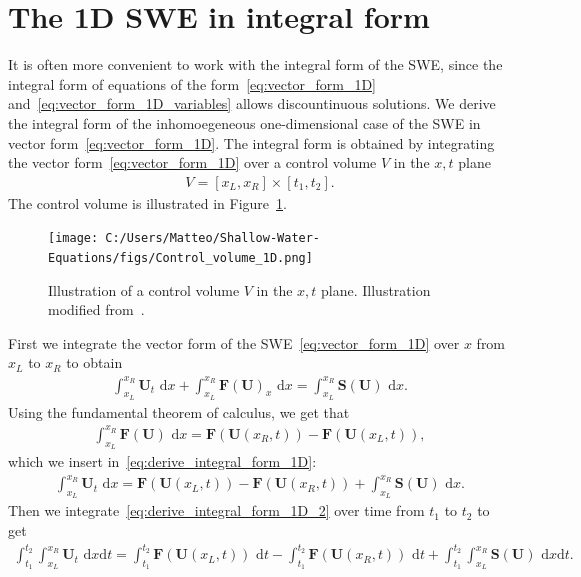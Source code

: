 \section{The 1D SWE in integral form}
It is often more convenient to work with the integral form of the SWE, since the integral form of equations of the form~\eqref{eq:vector_form_1D} and~\eqref{eq:vector_form_1D_variables} allows discountinuous solutions.
We derive the integral form of the inhomoegeneous one-dimensional case of the SWE in vector form~\eqref{eq:vector_form_1D}.
The integral form is obtained by integrating the vector form~\eqref{eq:vector_form_1D} over a control volume $V$ in the $x,t$ plane
\begin{align*}
    V = [x_L, x_R] \times [t_1, t_2].
\end{align*}
The control volume is illustrated in Figure~\ref{fig:control_volume_1D}.
\begin{figure}[H]
    \centering
    \texttt{[image: C:/Users/Matteo/Shallow-Water-Equations/figs/Control\_volume\_1D.png]}
    \caption{Illustration of a control volume $V$ in the $x,t$ plane. Illustration modified from~\cite{Toro2024}.}\label{fig:control_volume_1D}
\end{figure}
First we integrate the vector form of the SWE~\eqref{eq:vector_form_1D} over $x$ from $x_L$ to $x_R$ to obtain
\begin{align}\label{eq:derive_integral_form_1D}
    \int_{x_L}^{x_R} \mathbf{U}_t \text{ d}x + \int_{x_L}^{x_R} \mathbf{F(U)}_x \text{ d}x = \int_{x_L}^{x_R} \mathbf{S(U)} \text{ d}x.
\end{align}
Using the fundamental theorem of calculus, we get that 
\begin{align*}
    \int_{x_L}^{x_R} \mathbf{F}(\mathbf{U}) \text{ d}x = \mathbf{F}(\mathbf{U}(x_R, t)) - \mathbf{F}(\mathbf{U}(x_L, t)),
\end{align*}
which we insert in~\eqref{eq:derive_integral_form_1D}:
\begin{align}\label{eq:derive_integral_form_1D_2}
    \int_{x_L}^{x_R} \mathbf{U}_t \text{ d}x = \mathbf{F}(\mathbf{U}(x_L, t)) - \mathbf{F}(\mathbf{U}(x_R, t)) + \int_{x_L}^{x_R} \mathbf{S(U)} \text{ d}x.
\end{align}
Then we integrate~\eqref{eq:derive_integral_form_1D_2} over time from $t_1$ to $t_2$ to get
\begin{align*}
    \int_{t_1}^{t_2} \int_{x_L}^{x_R} \mathbf{U}_t \text{ d}x \text{d}t = \int_{t_1}^{t_2} \mathbf{F}(\mathbf{U}(x_L, t)) \text{ d}t - \int_{t_1}^{t_2} \mathbf{F}(\mathbf{U}(x_R, t)) \text{ d}t + \int_{t_1}^{t_2} \int_{x_L}^{x_R} \mathbf{S(U)} \text{ d}x \text{d}t.
\end{align*}
